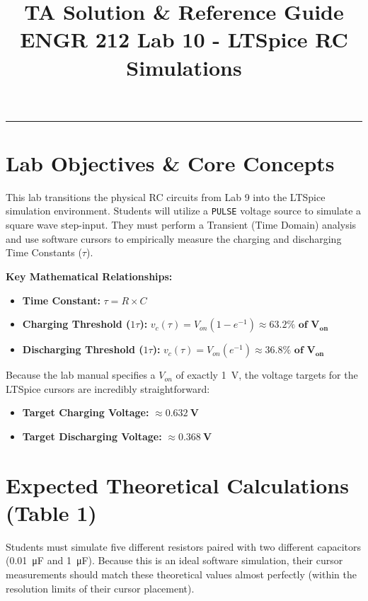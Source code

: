 \documentclass[11pt]{article}
\title{\vspace{-1in}\textbf{TA Solution \& Reference Guide} \\ \Large ENGR 212 Lab 10 - LTSpice RC Simulations}
\author{}
\date{}
\begin{document}
\maketitle
\vspace{-0.5in}
\hrule
\vspace{0.2in}

\section*{Lab Objectives \& Core Concepts}
This lab transitions the physical RC circuits from Lab 9 into the LTSpice simulation environment. Students will utilize a \texttt{PULSE} voltage source to simulate a square wave step-input. They must perform a Transient (Time Domain) analysis and use software cursors to empirically measure the charging and discharging Time Constants ($\tau$).

\textbf{Key Mathematical Relationships:}
\begin{itemize}
  \item \textbf{Time Constant:} $\tau = R \times C$
  \item \textbf{Charging Threshold ($1\tau$):} $v_c(\tau) = V_{on}(1 - e^{-1}) \approx \mathbf{63.2\% \text{ of } V_{on}}$
  \item \textbf{Discharging Threshold ($1\tau$):} $v_c(\tau) = V_{on}(e^{-1}) \approx \mathbf{36.8\% \text{ of } V_{on}}$
\end{itemize}

Because the lab manual specifies a $V_{on}$ of exactly \SI{1}{\volt}, the voltage targets for the LTSpice cursors are incredibly straightforward:
\begin{itemize}
  \item \textbf{Target Charging Voltage:} $\approx \mathbf{\SI{0.632}{\volt}}$
  \item \textbf{Target Discharging Voltage:} $\approx \mathbf{\SI{0.368}{\volt}}$
\end{itemize}

\vspace{0.2in}
\section*{Expected Theoretical Calculations (Table 1)}

Students must simulate five different resistors paired with two different capacitors (\SI{0.01}{\micro\farad} and \SI{1}{\micro\farad}). Because this is an ideal software simulation, their cursor measurements should match these theoretical values almost perfectly (within the resolution limits of their cursor placement).
\end{document}
